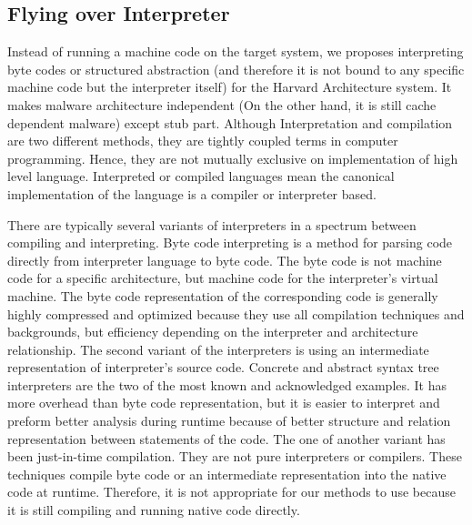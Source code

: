 	\subsection{Flying over Interpreter}
	Instead of running a machine code on the target system, we proposes interpreting byte codes or structured abstraction (and therefore it is not bound to any specific machine code but the interpreter itself) for the Harvard Architecture system. It makes malware architecture independent (On the other hand, it is still cache dependent malware) except stub part. Although Interpretation and compilation are two different methods, they are tightly coupled terms in computer programming. Hence, they are not mutually exclusive on implementation of high level language. Interpreted or compiled languages mean the canonical implementation of the language is a compiler or interpreter based\cite{mak2011writing}.

	There are typically several variants of interpreters in a spectrum between compiling and interpreting\cite{mak2011writing}. Byte code interpreting is a method for parsing code directly from interpreter language to byte code. The byte code is not machine code for a specific architecture, but machine code for the interpreter's virtual machine. The byte code representation of the corresponding code is generally highly compressed and optimized because they use all compilation techniques and backgrounds, but efficiency depending on the interpreter and architecture relationship\cite{mak2011writing}. The second variant of the interpreters is using an intermediate representation of interpreter's source code. Concrete and abstract syntax tree interpreters are the two of the most known and acknowledged examples. It has more overhead than byte code representation, but it is easier to interpret and preform better analysis during runtime because of better structure and relation representation between statements of the code\cite{mak2011writing}. The one of another variant has been just-in-time compilation. They are not pure interpreters or compilers. These techniques compile byte code or an intermediate representation into the native code at runtime. Therefore, it is not appropriate for our methods to use because it is still compiling and running native code directly. 

